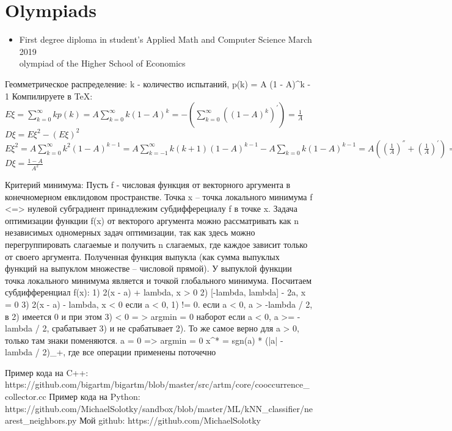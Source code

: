 \documentclass[letterpaper,11pt]{article}
\newcommand{\resumeSubHeadingListStart}{\begin{itemize}[leftmargin=*]}
\newcommand{\resumeSubHeadingListEnd}{\end{itemize}}
\begin{document}
\vspace{-23pt}
\section{Olympiads}
  \resumeSubHeadingListStart
      \item{
    		First degree diploma in student's Applied Math and Computer Science
    		\hfill
        March 2019 \\
        olympiad of the Higher School of Economics
      }
  \resumeSubHeadingListEnd

Геомметрическое распределение: k - количество испытаний, p(k) = A (1 - A)^{k - 1}
Компилируете в TeX:
$E\xi = \sum_{k = 0}^\infty k p(k) = A \sum_{k = 0}^\infty k (1 - A)^k = -(\sum_{k = 0}^{\infty} ((1 - A)^k)^{'}) = \frac{1}{A}$
$D\xi = E\xi^2 - (E\xi)^2$
$E\xi^2 = A \sum_{k = 0}^\infty k^2 (1 - A)^{k - 1} = A \sum_{k = -1}^\infty k (k + 1) (1 - A) ^{k - 1} - A \sum_{k = 0} k (1 - A)^{k - 1} = A ((\frac{1}{A})^{''} + (\frac{1}{A})^{'}) = \frac{2- A}{A^2}$
$D\xi = \frac{1 - A}{A^2}$


Критерий минимума:
Пусть f - числовая функция от векторного аргумента в конечномерном евклидовом пространстве. Точка x -- точка локального минимума f <=> нулевой субградиент принадлежим субдифферециалу f в точке x.
Задача оптимизации функции f(x) от векторого аргумента можно рассматривать как n независимых одномерных задач оптимизации, так как здесь можно перегруппировать слагаемые и получить n слагаемых, где каждое зависит только от своего аргумента. Полученная функция выпукла (как сумма выпуклых функций на выпуклом множестве -- числовой прямой). У выпуклой функции точка локального минимума является и точкой глобального минимума. Посчитаем субдифференциал f(x):
1) 2(x - a) + lambda, x > 0
2) [-lambda, lambda] - 2a, x = 0
3) 2(x - a) - lambda, x < 0
если a < 0, 1) != 0.
если a < 0, a > -lambda / 2, в 2) имеется 0 и при этом 3) < 0 = > argmin = 0
наборот если a < 0, a >= -lambda / 2, срабатывает 3) и не срабатывает 2).
То же самое верно для a > 0, только там знаки поменяются.
a = 0 => argmin = 0
x^* = sgn(a) * (|a| - lambda / 2)_+, где все операции применены поточечно


Пример кода на C++:
https://github.com/bigartm/bigartm/blob/master/src/artm/core/cooccurrence_collector.cc
Пример кода на Python:
https://github.com/MichaelSolotky/sandbox/blob/master/ML/kNN_classifier/nearest_neighbors.py
Мой github:
https://github.com/MichaelSolotky
\end{document}
